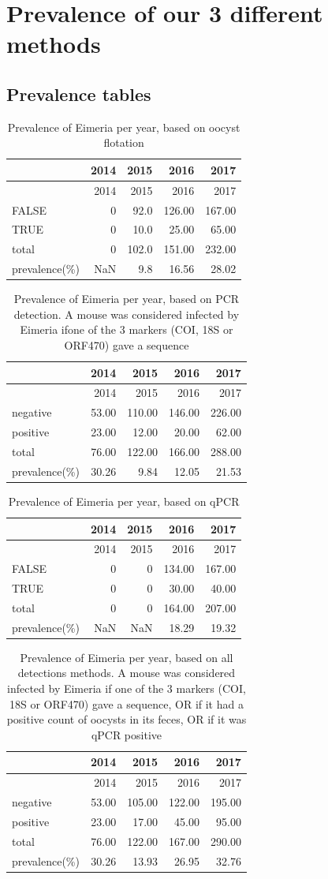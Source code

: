 \documentclass[]{article}
\begin{document}
\section{Prevalence of our 3 different
methods}\label{prevalence-of-our-3-different-methods}

\subsection{Prevalence tables}\label{prevalence-tables}

\begin{longtable}[]{@{}lrrrr@{}}
\caption{Prevalence of Eimeria per year, based on oocyst
flotation}\tabularnewline
\toprule
& 2014 & 2015 & 2016 & 2017\tabularnewline
\midrule
\endfirsthead
\toprule
& 2014 & 2015 & 2016 & 2017\tabularnewline
\midrule
\endhead
FALSE & 0 & 92.0 & 126.00 & 167.00\tabularnewline
TRUE & 0 & 10.0 & 25.00 & 65.00\tabularnewline
total & 0 & 102.0 & 151.00 & 232.00\tabularnewline
prevalence(\%) & NaN & 9.8 & 16.56 & 28.02\tabularnewline
\bottomrule
\end{longtable}

\begin{longtable}[]{@{}lrrrr@{}}
\caption{Prevalence of Eimeria per year, based on PCR detection. A mouse
was considered infected by Eimeria ifone of the 3 markers (COI, 18S or
ORF470) gave a sequence}\tabularnewline
\toprule
& 2014 & 2015 & 2016 & 2017\tabularnewline
\midrule
\endfirsthead
\toprule
& 2014 & 2015 & 2016 & 2017\tabularnewline
\midrule
\endhead
negative & 53.00 & 110.00 & 146.00 & 226.00\tabularnewline
positive & 23.00 & 12.00 & 20.00 & 62.00\tabularnewline
total & 76.00 & 122.00 & 166.00 & 288.00\tabularnewline
prevalence(\%) & 30.26 & 9.84 & 12.05 & 21.53\tabularnewline
\bottomrule
\end{longtable}

\begin{longtable}[]{@{}lrrrr@{}}
\caption{Prevalence of Eimeria per year, based on qPCR}\tabularnewline
\toprule
& 2014 & 2015 & 2016 & 2017\tabularnewline
\midrule
\endfirsthead
\toprule
& 2014 & 2015 & 2016 & 2017\tabularnewline
\midrule
\endhead
FALSE & 0 & 0 & 134.00 & 167.00\tabularnewline
TRUE & 0 & 0 & 30.00 & 40.00\tabularnewline
total & 0 & 0 & 164.00 & 207.00\tabularnewline
prevalence(\%) & NaN & NaN & 18.29 & 19.32\tabularnewline
\bottomrule
\end{longtable}

\begin{longtable}[]{@{}lrrrr@{}}
\caption{Prevalence of Eimeria per year, based on all detections
methods. A mouse was considered infected by Eimeria if one of the 3
markers (COI, 18S or ORF470) gave a sequence, OR if it had a positive
count of oocysts in its feces, OR if it was qPCR
positive}\tabularnewline
\toprule
& 2014 & 2015 & 2016 & 2017\tabularnewline
\midrule
\endfirsthead
\toprule
& 2014 & 2015 & 2016 & 2017\tabularnewline
\midrule
\endhead
negative & 53.00 & 105.00 & 122.00 & 195.00\tabularnewline
positive & 23.00 & 17.00 & 45.00 & 95.00\tabularnewline
total & 76.00 & 122.00 & 167.00 & 290.00\tabularnewline
prevalence(\%) & 30.26 & 13.93 & 26.95 & 32.76\tabularnewline
\bottomrule
\end{longtable}
\end{document}
